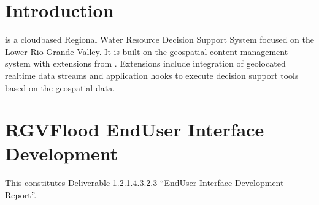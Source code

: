 \documentclass[letterpaper,12pt,english,openany,oneside]{sphinxmanual}
\begin{document}
\chapter{Introduction}
\label{\detokenize{introduction/index:introduction}}\label{\detokenize{introduction/index::doc}}
\sphinxAtStartPar
{} is a cloud\sphinxhyphen{}based Regional Water Resource Decision Support System focused on the Lower Rio Grande Valley. It is built on the  geospatial content management system with extensions from .  Extensions  include integration of geolocated real\sphinxhyphen{}time data streams and application hooks to execute decision support tools based on the geospatial data.

\sphinxstepscope


\chapter{RGVFlood End\sphinxhyphen{}User Interface Development}
\label{\detokenize{euidev/index:rgvflood-end-user-interface-development}}\label{\detokenize{euidev/index::doc}}
\sphinxAtStartPar
This constitutes Deliverable 1.2.1.4.3.2.3 “End\sphinxhyphen{}User Interface Development Report”.

\sphinxstepscope
\end{document}
